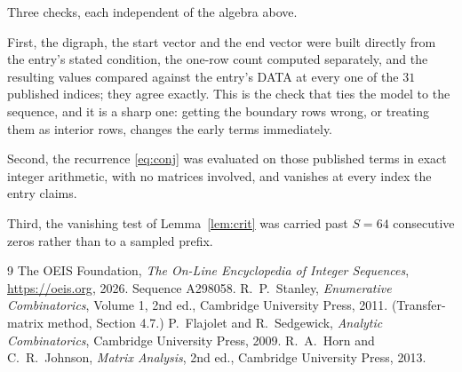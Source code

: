 \documentclass[11pt,a4paper]{article}
\theoremstyle{plain}
\theoremstyle{definition}
\begin{document}
Three checks, each independent of the algebra above.

First, the digraph, the start vector and the end vector were built directly from the
entry's stated condition, the one-row count computed separately, and the resulting values
compared against the entry's DATA at every one of the $31$ published indices; they
agree exactly. This is the check that ties the model to the sequence, and it is a sharp one:
getting the boundary rows wrong, or treating them as interior rows, changes the early terms
immediately.

Second, the recurrence \eqref{eq:conj} was evaluated on those published terms in exact
integer arithmetic, with no matrices involved, and vanishes at every index the entry claims.

Third, the vanishing test of Lemma~\ref{lem:crit} was carried past $S=64$ consecutive
zeros rather than to a sampled prefix.

\begin{thebibliography}{9}
 The OEIS Foundation, \emph{The On-Line Encyclopedia of Integer
Sequences}, \url{https://oeis.org}, 2026. Sequence A298058.
 R.~P.~Stanley, \emph{Enumerative Combinatorics}, Volume 1, 2nd ed.,
Cambridge University Press, 2011. (Transfer-matrix method, Section 4.7.)
 P.~Flajolet and R.~Sedgewick, \emph{Analytic Combinatorics}, Cambridge
University Press, 2009.
 R.~A.~Horn and C.~R.~Johnson, \emph{Matrix Analysis}, 2nd ed., Cambridge
University Press, 2013.
\end{thebibliography}
\end{document}
